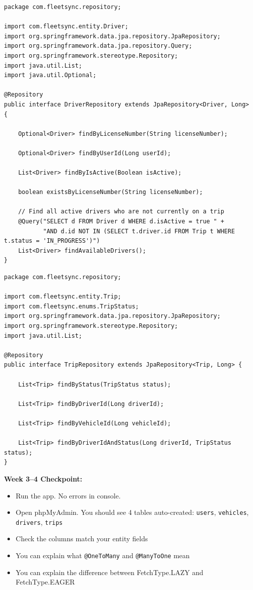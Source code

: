 \documentclass[12pt,a4paper]{report}
\newcommand{\code}[1]{\texttt{\textcolor{keywordblue}{#1}}}
\begin{document}
\begin{lstlisting}[caption=DriverRepository.java]
package com.fleetsync.repository;

import com.fleetsync.entity.Driver;
import org.springframework.data.jpa.repository.JpaRepository;
import org.springframework.data.jpa.repository.Query;
import org.springframework.stereotype.Repository;
import java.util.List;
import java.util.Optional;

@Repository
public interface DriverRepository extends JpaRepository<Driver, Long> {

    Optional<Driver> findByLicenseNumber(String licenseNumber);

    Optional<Driver> findByUserId(Long userId);

    List<Driver> findByIsActive(Boolean isActive);

    boolean existsByLicenseNumber(String licenseNumber);

    // Find all active drivers who are not currently on a trip
    @Query("SELECT d FROM Driver d WHERE d.isActive = true " +
           "AND d.id NOT IN (SELECT t.driver.id FROM Trip t WHERE t.status = 'IN_PROGRESS')")
    List<Driver> findAvailableDrivers();
}
\end{lstlisting}

\begin{lstlisting}[caption=TripRepository.java]
package com.fleetsync.repository;

import com.fleetsync.entity.Trip;
import com.fleetsync.enums.TripStatus;
import org.springframework.data.jpa.repository.JpaRepository;
import org.springframework.stereotype.Repository;
import java.util.List;

@Repository
public interface TripRepository extends JpaRepository<Trip, Long> {

    List<Trip> findByStatus(TripStatus status);

    List<Trip> findByDriverId(Long driverId);

    List<Trip> findByVehicleId(Long vehicleId);

    List<Trip> findByDriverIdAndStatus(Long driverId, TripStatus status);
}
\end{lstlisting}

\begin{tcolorbox}[successbox]
\textbf{Week 3--4 Checkpoint:}
\begin{itemize}
  \item[$\checkmark$] Run the app. No errors in console.
  \item[$\checkmark$] Open phpMyAdmin. You should see 4 tables auto-created: \code{users}, \code{vehicles}, \code{drivers}, \code{trips}
  \item[$\checkmark$] Check the columns match your entity fields
  \item[$\checkmark$] You can explain what \code{@OneToMany} and \code{@ManyToOne} mean
  \item[$\checkmark$] You can explain the difference between FetchType.LAZY and FetchType.EAGER
\end{itemize}
\end{tcolorbox}
\end{document}
